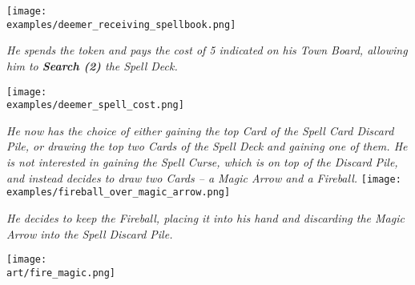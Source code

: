 \begin{multicols*}{2}
\texttt{[image: \\examples/deemer\_receiving\_spellbook.png]}\par
\textit{He spends the token and pays the cost of 5  indicated on his Town Board, allowing him to \textbf{Search (2)} the Spell Deck.}\par
\texttt{[image: \\examples/deemer\_spell\_cost.png]}\par
\filbreak
\textit{He now has the choice of either gaining the top Card of the Spell Card Discard Pile, or drawing the top two Cards of the Spell Deck and gaining one of them.
He is not interested in gaining the Spell Curse, which is on top of the Discard Pile, and instead decides to draw two Cards – a Magic Arrow and a Fireball.}
\texttt{[image: \\examples/fireball\_over\_magic\_arrow.png]}\par
\textit{He decides to keep the Fireball, placing it into his hand and discarding the Magic Arrow into the Spell Discard Pile.}

\vspace*{\fill}

\hfill{\texttt{[image: \\art/fire\_magic.png]}}

\end{multicols*}
